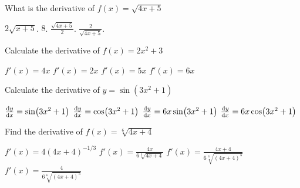 \documentclass{exam}
\begin{document}
\begin{questions}
	\question What is the derivative of $f(x) = \sqrt{4x+5}$

	\begin{choices}
		\choice $2\sqrt{x+5}$.
		\choice $8$.
		\choice $\frac{\sqrt{4x+5}}{2}$.
		\CorrectChoice $\frac{2}{\sqrt{4x+5}}$.
	\end{choices}
	\question Calculate the derivative of $f(x) = 2x^2+3$

	\begin{choices}
		\CorrectChoice $f'(x) = 4x$
		\choice $f'(x) = 2x$
		\choice $f'(x) = 5x$
		\choice $f'(x) = 6x$
	\end{choices}
	\question Calculate the derivative  of $y=\sin(3x{^2}+1)$

	\begin{choices}
		\choice $\dv{y}{x} = \sin(3x{^2}+1)$
		\choice $\dv{y}{x} = \cos(3x{^2}+1)$
        \choice $\dv{y}{x} = 6x\sin(3x{^2}+1)$
		\CorrectChoice $\dv{y}{x} = 6x \cos(3x{^2}+1)$
	\end{choices}
	\question Find the derivative of $f(x) = \sqrt[6]{4x+4}$

	\begin{choices}
		\choice $f'(x) = 4 (4x+4)^{-1/3} $
		\choice $f'(x) = \frac{4x }{6 \sqrt[3]{4x+4}}$
		\choice $f'(x) = \frac{4 x + 4}{6 \sqrt[6]{(4x + 4)^{5}}} $
		\CorrectChoice $f'(x) = \frac{4}{6 \sqrt[6]{(4x + 4)^{5}}}$
	\end{choices}

\end{questions}
\end{document}
